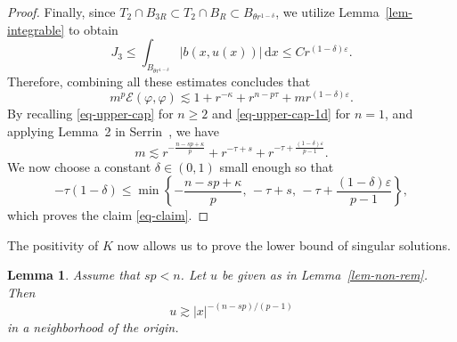 \documentclass[11pt]{amsart}
\theoremstyle{plain}
\newtheorem{lemma}[theorem]{Lemma}
\theoremstyle{definition}
\numberwithin{equation}{section}
\begin{document}
\begin{proof}
Finally, since $T_2 \cap B_{3R} \subset T_2 \cap B_{R} \subset B_{\theta r^{1-\delta}}$, we utilize Lemma~\ref{lem-integrable} to obtain
\begin{equation*}
    J_{3} \leq \int_{B_{\theta r^{1-\delta}}} |b(x, u(x))|\,\mathrm{d}x \leq Cr^{(1-\delta)\varepsilon}.
\end{equation*}
Therefore, combining all these estimates concludes that
	\begin{equation*}
		m^{p}\mathcal{E}(\varphi, \varphi) \lesssim 1+r^{-\kappa}+r^{n-p\tau}+mr^{(1-\delta)\varepsilon}.
	\end{equation*}
	By recalling \eqref{eq-upper-cap} for $n\geq 2$ and \eqref{eq-upper-cap-1d} for $n=1$, and applying 	Lemma~2 in Serrin~\cite{Ser64}, we have 
	\begin{equation*}
		m \lesssim r^{-\frac{n-sp+\kappa}{p}} + r^{-\tau+s} + r^{-\tau+\frac{(1-\delta)\varepsilon}{p-1}}.
	\end{equation*}
	We now choose a constant $\delta \in (0,1)$ small enough so that
	\begin{equation*}
		-\tau (1-\delta) \leq \min\left\{ -\frac{n-sp+\kappa}{p},\, -\tau+s,\, -\tau+\frac{(1-\delta)\varepsilon}{p-1}\right\},
	\end{equation*}
	which proves the claim \eqref{eq-claim}.
\end{proof}


The positivity of $K$ now allows us to prove the lower bound of singular solutions.

\begin{lemma}\label{lem-lower}
Assume that $sp<n$. Let $u$ be given as in Lemma~\ref{lem-non-rem}. Then
\begin{equation*}
u \gtrsim |x|^{-(n-sp)/(p-1)}
\end{equation*}
in a neighborhood of the origin.
\end{lemma}
\end{document}
